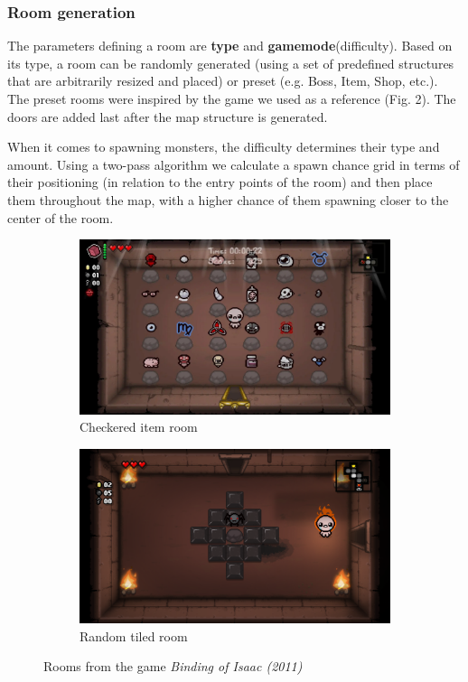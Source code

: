 \documentclass{article}
\begin{document}
\subsubsection{Room generation}
The parameters defining a room are \textbf{type} and \textbf{gamemode}(difficulty). Based on its type, a room can be randomly generated (using a set of predefined structures that are arbitrarily resized and placed) or preset (e.g. Boss, Item, Shop, etc.). The preset rooms were inspired by the game we used as a reference (Fig. 2). The doors are added last after the map structure is generated.\par
When it comes to spawning monsters, the difficulty determines their type and amount. Using a two-pass algorithm we calculate a spawn chance grid in terms of their positioning (in relation to the entry points of the room) and then place them throughout the map, with a higher chance of them spawning closer to the center of the room.
\begin{figure}[H]
\centering
\begin{subfigure}{.5\textwidth}
  \centering
  \includegraphics[width=0.9\linewidth]{images/checkeredRoom.png}
  \caption{Checkered item room}
  \label{fig:sub4}
\end{subfigure}%
\begin{subfigure}{.5\textwidth}
  \centering
  \includegraphics[width=0.9\linewidth]{images/randomTile.png}
  \caption{Random tiled room}
  \label{fig:sub5}
\end{subfigure}
\caption{Rooms from the game \textit{Binding of Isaac (2011)}}
\label{fig:test2}
\end{figure}
\end{document}
